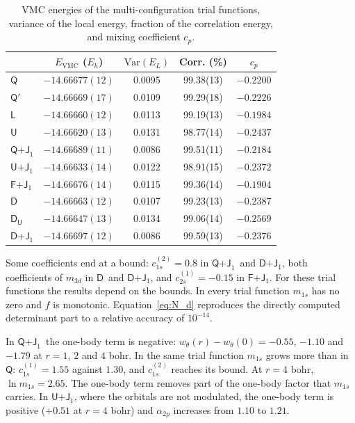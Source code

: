 \documentclass[aps,prb,reprint,amsmath,amssymb,superscriptaddress,nofootinbib]{revtex4-2}
\newcommand{\mQ}{\ensuremath{\textsf{Q}}}
\newcommand{\mQb}{\ensuremath{\textsf{Q}'}}
\newcommand{\mL}{\ensuremath{\textsf{L}}}
\newcommand{\mU}{\ensuremath{\textsf{U}}}
\newcommand{\mQJ}{\ensuremath{\textsf{Q+J}_1}}
\newcommand{\mUJ}{\ensuremath{\textsf{U+J}_1}}
\newcommand{\mFJ}{\ensuremath{\textsf{F+J}_1}}
\newcommand{\mD}{\ensuremath{\textsf{D}}}
\newcommand{\mDU}{\ensuremath{\textsf{D}_{\textsf{U}}}}
\newcommand{\mDJ}{\ensuremath{\textsf{D+J}_1}}
\begin{document}
\begin{table}[t]
\caption{VMC energies of the multi-configuration trial functions, variance of
the local energy, fraction of the correlation energy, and mixing coefficient
$c_p$.}
\label{tab:vmc}
\centering
\small
\setlength{\tabcolsep}{4pt}
\begin{tabular}{lcccc}
\hline\hline
 & $E_{\mathrm{VMC}}$ ($E_h$) & $\mathrm{Var}(E_L)$ & Corr. (\%) & $c_p$ \\
\hline
\mQ   & $-14.66677(12)$ & 0.0095 & 99.38(13) & $-0.2200$ \\
\mQb  & $-14.66669(17)$ & 0.0109 & 99.29(18) & $-0.2226$ \\
\mL   & $-14.66660(12)$ & 0.0113 & 99.19(13) & $-0.1984$ \\
\mU   & $-14.66620(13)$ & 0.0131 & 98.77(14) & $-0.2437$ \\
\mQJ  & $-14.66689(11)$ & 0.0086 & 99.51(11) & $-0.2184$ \\
\mUJ  & $-14.66633(14)$ & 0.0122 & 98.91(15) & $-0.2372$ \\
\mFJ  & $-14.66676(14)$ & 0.0115 & 99.36(14) & $-0.1904$ \\
\mD   & $-14.66663(12)$ & 0.0107 & 99.23(13) & $-0.2387$ \\
\mDU  & $-14.66647(13)$ & 0.0134 & 99.06(14) & $-0.2569$ \\
\mDJ  & $-14.66697(12)$ & 0.0086 & 99.59(13) & $-0.2376$ \\
\hline\hline
\end{tabular}
\end{table}

Some coefficients end at a bound: $c^{(2)}_{1s} = 0.8$ in \mQJ\ and \mDJ, both
coefficients of $m_{3d}$ in \mD\ and \mDJ, and $c^{(1)}_{2s} = -0.15$ in \mFJ.
For these trial functions the results depend on the bounds. In every trial
function $m_{1s}$ has no zero and $f$ is monotonic. Equation~\eqref{eq:N_d}
reproduces the directly computed determinant part to a relative accuracy of
$10^{-14}$.

In \mQJ\ the one-body term is negative: $w_\theta(r) - w_\theta(0) = -0.55$,
$-1.10$ and $-1.79$ at $r = 1$, $2$ and $4$ bohr. In the same trial function
$m_{1s}$ grows more than in \mQ: $c^{(1)}_{1s} = 1.55$ against $1.30$, and
$c^{(2)}_{1s}$ reaches its bound. At $r = 4$ bohr, $\ln m_{1s} = 2.65$. The
one-body term removes part of the one-body factor that $m_{1s}$ carries. In
\mUJ, where the orbitals are not modulated, the one-body term is positive
($+0.51$ at $r = 4$ bohr) and $\alpha_{2p}$ increases from $1.10$ to $1.21$.
\end{document}
